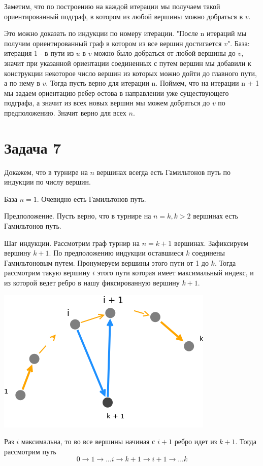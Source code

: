 \documentclass{article}
\begin{document}
	Заметим, что по построению на каждой итерации мы получаем такой ориентированный подграф, в котором из любой вершины можно добраться в  $v$.
	
	Это можно доказать по индукции по номеру итерации. "После n итераций мы получим ориентированный граф в котором из все вершин достигается $v$". База: итерация 1 - в пути из $u$ в $v$ можно было добраться от любой вершины до $v$, значит при указанной ориентации соединенных с путем вершин мы добавили к конструкции некоторое число вершин из которых можно дойти до главного пути, а по нему в $v$. Тогда пусть верно для итерации n. Поймем, что на итерации n + 1 мы задаем ориентацию ребер остова в направлении уже существующего подграфа, а значит из всех новых вершин мы можем добраться до $v$ по предположению. Значит верно для всех $n$.
	
	\section{Задача 7}
	
	Докажем, что в турнире на $n$ вершинах всегда есть Гамильтонов путь по индукции по числу вершин.
	
	База $n=1$. Очевидно есть Гамильтонов путь.
	
	Предположение. Пусть верно, что в турнире на $n=k, k>2$ вершинах есть Гамильтонов путь.
	
	Шаг индукции. Рассмотрим граф турнир на $n=k + 1$ вершинах. Зафиксируем вершину $k + 1$. По предположению индукции оставшиеся $k$ соединены Гамильтоновым путем. Пронумеруем вершины этого пути от 1 до $k$. Тогда рассмотрим такую вершину $i$ этого пути которая имеет максимальный индекс, и из которой ведет ребро в нашу фиксированную вершину $k + 1$. 
	
	\includegraphics[scale=0.5]{7_1}
	
	Раз $i$ максимальна, то во все вершины начиная с $i + 1$ ребро идет из $k + 1$. Тогда рассмотрим путь $$0 \longrightarrow 1 \longrightarrow ... i \longrightarrow k + 1 \longrightarrow i + 1 \longrightarrow ... k$$
	
\end{document}
